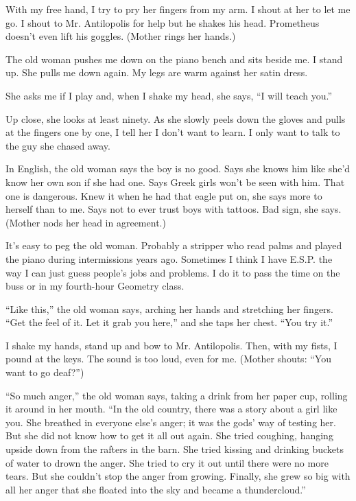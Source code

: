 \documentclass[
]{article}
\begin{document}
With my free hand, I try to pry her fingers from my arm. I shout at her
to let me go. I shout to Mr. Antilopolis for help but he shakes his
head. Prometheus doesn't even lift his goggles. (Mother rings her
hands.)

The old woman pushes me down on the piano bench and sits beside me. I
stand up. She pulls me down again. My legs are warm against her satin
dress.

She asks me if I play and, when I shake my head, she says, ``I will
teach you.''

Up close, she looks at least ninety. As she slowly peels down the gloves
and pulls at the fingers one by one, I tell her I don't want to learn. I
only want to talk to the guy she chased away.

In English, the old woman says the boy is no good. Says she knows him
like she'd know her own son if she had one. Says Greek girls won't be
seen with him. That one is dangerous. Knew it when he had that eagle put
on, she says more to herself than to me. Says not to ever trust boys
with tattoos. Bad sign, she says. (Mother nods her head in agreement.)

It's easy to peg the old woman. Probably a stripper who read palms and
played the piano dur­ing intermissions years ago. Sometimes I think I
have E.S.P. the way I can just guess people's jobs and problems. I do it
to pass the time on the buss or in my fourth-hour Geometry class.

``Like this,'' the old woman says, arching her hands and stretching her
fingers. ``Get the feel of it. Let it grab you here,'' and she taps her
chest. ``You try it.''

I shake my hands, stand up and bow to Mr. Antilopolis. Then, with my
fists, I pound at the keys. The sound is too loud, even for me. (Mother
shouts: ``You want to go deaf?'')

``So much anger,'' the old woman says, taking a drink from her paper
cup, rolling it around in her mouth. ``In the old country, there was a
story about a girl like you. She breathed in everyone else's anger; it
was the gods' way of testing her. But she did not know how to get it all
out again. She tried coughing, hanging upside down from the rafters in
the barn. She tried kissing and drinking buckets of water to drown the
anger. She tried to cry it out until there were no more tears. But she
couldn't stop the anger from growing. Finally, she grew so big with all
her anger that she floated into the sky and became a thundercloud.''
\end{document}
